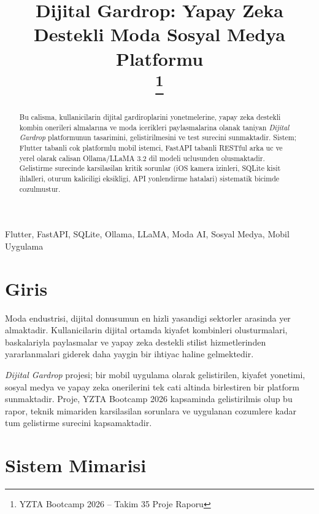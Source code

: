 \documentclass[conference]{IEEEtran}
\begin{document}
\title{Dijital Gardrop: Yapay Zeka Destekli Moda Sosyal Medya Platformu\\
\thanks{YZTA Bootcamp 2026 -- Takim 35 Proje Raporu}}

\author{
}

\maketitle

\begin{abstract}
Bu calisma, kullanicilarin dijital gardiroplarini yonetmelerine, yapay zeka destekli kombin onerileri almalarına ve moda icerikleri paylasmalarina olanak taniyan \textit{Dijital Gardrop} platformunun tasarimini, gelistirilmesini ve test surecini sunmaktadir. Sistem; Flutter tabanli cok platformlu mobil istemci, FastAPI tabanli RESTful arka uc ve yerel olarak calisan Ollama/LLaMA 3.2 dil modeli uclusunden olusmaktadir. Gelistirme surecinde karsilasilan kritik sorunlar (iOS kamera izinleri, SQLite kisit ihlalleri, oturum kaliciligi eksikligi, API yonlendirme hatalari) sistematik bicimde cozulmustur.
\end{abstract}

\begin{IEEEkeywords}
Flutter, FastAPI, SQLite, Ollama, LLaMA, Moda AI, Sosyal Medya, Mobil Uygulama
\end{IEEEkeywords}

\section{Giris}

Moda endustrisi, dijital donusumun en hizli yasandigi sektorler arasinda yer almaktadir. Kullanicilarin dijital ortamda kiyafet kombinleri olusturmalari, baskalariyla paylasmalar ve yapay zeka destekli stilist hizmetlerinden yararlanmalari giderek daha yaygin bir ihtiyac haline gelmektedir.

\textit{Dijital Gardrop} projesi; bir mobil uygulama olarak gelistirilen, kiyafet yonetimi, sosyal medya ve yapay zeka onerilerini tek cati altinda birlestiren bir platform sunmaktadir. Proje, YZTA Bootcamp 2026 kapsaminda gelistirilmis olup bu rapor, teknik mimariden karsilasilan sorunlara ve uygulanan cozumlere kadar tum gelistirme surecini kapsamaktadir.

\section{Sistem Mimarisi}
\end{document}
